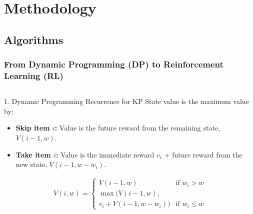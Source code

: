 \section{Methodology}

\subsection{Algorithms}

\begin{frame}
    \frametitle{From Dynamic Programming (DP) to Reinforcement Learning (RL)}

    \begin{columns}[T]
        \begin{column}{0.5\textwidth}
            \begin{block}{1. Dynamic Programming Recurrence for KP}
                State value is the maximum value by:
                \begin{itemize}
                    \item \textbf{Skip item $i$:} Value is the future reward from the remaining state, $V(i-1, w)$.
                    \item \textbf{Take item $i$:} Value is the immediate reward $v_i$ + future reward from the new state, $V(i-1, w-w_i)$.
                \end{itemize}
                
                \begin{align*}
                    V(i, w) = 
                    \begin{cases}
                        V(i-1, w) & \text{if } w_i > w \\
                        \max( V(i-1, w), \\
                        v_i + V(i-1, w-w_i) ) & \text{if } w_i \le w
                    \end{cases}
                \end{align*}
            \end{block}
        \end{column}


\end{columns}
\end{frame}
